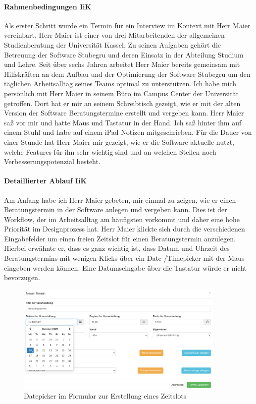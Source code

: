 \documentclass[12pt]{article}
\newcommand{\ipName}{Herr Maier }
\begin{document}
\paragraph{Rahmenbedingungen IiK}
Als erster Schritt wurde ein Termin für ein Interview im Kontext mit \ipName
{} vereinbart. \ipName ist einer von drei
Mitarbeitenden der allgemeinen Studienberatung der Universität Kassel. Zu
seinen Aufgaben gehört die Betreuung der Software Stubegru und deren Einsatz in
der Abteilung Studium und Lehre. Seit über sechs Jahren arbeitet \ipName
bereits gemeinsam mit Hilfskräften an dem Aufbau und der Optimierung der
Software Stubegru um den täglichen Arbeitsalltag seines Teams optimal zu
unterstützen. Ich habe mich persönlich mit \ipName in seinem Büro im Campus
Center der Universität getroffen. Dort hat er mir an seinem Schreibtisch
gezeigt, wie er mit der alten Version der Software Beratungstermine erstellt
und vergeben kann. \ipName saß vor mir und hatte Maus und Tastatur in der Hand.
Ich saß hinter ihm auf einem Stuhl und habe auf einem iPad Notizen
mitgeschrieben. Für die Dauer von einer Stunde hat \ipName mir gezeigt, wie er
die Software aktuelle nutzt, welche Features für ihn sehr wichtig sind und an
welchen Stellen noch Verbesserungspotenzial besteht.

\paragraph{Detaillierter Ablauf IiK}
Am Anfang habe ich \ipName gebeten, mir einmal zu zeigen, wie er einen
Beratungstermin in der Software anlegen und vergeben kann. Dies ist der
Workflow, der im Arbeitsalltag am häufigsten vorkommt und daher eine hohe
Priorität im Designprozess hat. \ipName klickte sich durch die verschiedenen
Eingabefelder um einen freien Zeitslot für einen Beratungstermin anzulegen.
Hierbei erwähnte er, dass es ganz wichtig ist, dass Datum und Uhrzeit des
Beratungstermins mit wenigen Klicks über ein Date-/Timepicker mit der Maus
eingeben werden können. Eine Datumseingabe über die Tastatur würde er nicht
bevorzugen.

\begin{figure}[h]
    \caption{Datepicker im Formular zur Erstellung eines Zeitslots}
    \centering
    \includegraphics[width=0.9\textwidth]{screen_old_datepicker.png}
\end{figure}
\end{document}
